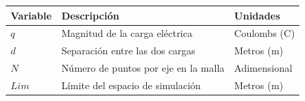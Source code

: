 
\begin{center}
\begin{tabular}{|l|l|l|}
\hline
\textbf{Variable} & \textbf{Descripción} & \textbf{Unidades} \\ \hline
$q$ & Magnitud de la carga eléctrica & Coulombs (C) \\ \hline
$d$ & Separación entre las dos cargas & Metros (m) \\ \hline
$N$ & Número de puntos por eje en la malla & Adimensional \\ \hline
$Lim$ & Límite del espacio de simulación & Metros (m) \\ \hline
\end{tabular}
\end{center}